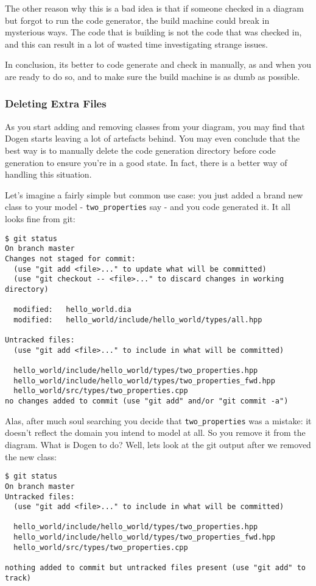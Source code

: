 \documentclass[11pt]{article}
\begin{document}
The other reason why this is a bad idea is that if someone checked in
a diagram but forgot to run the code generator, the build machine
could break in mysterious ways. The code that is building is not the
code that was checked in, and this can result in a lot of wasted time
investigating strange issues.

In conclusion, its better to code generate and check in manually, as
and when you are ready to do so, and to make sure the build machine is
as dumb as possible.

\subsubsection{Deleting Extra Files}
\label{sec-3-2-7}

As you start adding and removing classes from your diagram, you may
find that Dogen starts leaving a lot of artefacts behind. You may even
conclude that the best way is to manually delete the code generation
directory before code generation to ensure you're in a good state. In
fact, there is a better way of handling this situation.

Let's imagine a fairly simple but common use case: you just added a
brand new class to your model - \texttt{two\_properties} say - and you code
generated it. It all looks fine from git:

\begin{verbatim}
$ git status
On branch master
Changes not staged for commit:
  (use "git add <file>..." to update what will be committed)
  (use "git checkout -- <file>..." to discard changes in working directory)

  modified:   hello_world.dia
  modified:   hello_world/include/hello_world/types/all.hpp

Untracked files:
  (use "git add <file>..." to include in what will be committed)

  hello_world/include/hello_world/types/two_properties.hpp
  hello_world/include/hello_world/types/two_properties_fwd.hpp
  hello_world/src/types/two_properties.cpp
no changes added to commit (use "git add" and/or "git commit -a")
\end{verbatim}

Alas, after much soul searching you decide that \texttt{two\_properties} was a
mistake: it doesn't reflect the domain you intend to model at all. So
you remove it from the diagram. What is Dogen to do? Well, lets look
at the git output after we removed the new class:

\begin{verbatim}
$ git status
On branch master
Untracked files:
  (use "git add <file>..." to include in what will be committed)

  hello_world/include/hello_world/types/two_properties.hpp
  hello_world/include/hello_world/types/two_properties_fwd.hpp
  hello_world/src/types/two_properties.cpp

nothing added to commit but untracked files present (use "git add" to track)
\end{verbatim}
\end{document}
